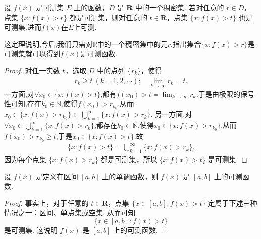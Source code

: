\documentclass[../../main.tex]{subfiles}
\begin{document}
\begin{theorem}\label{theorem:定理3.1}
设 \(f(x)\) 是可测集 \(E\) 上的函数，\(D\) 是 \(\mathbf{R}\) 中的一个稠密集. 若对任意的 \(r \in D\)，点集 \(\{x: f(x) > r\}\) 都是可测集，则对任意的 \(t \in \mathbf{R}\)，点集 \(\{x: f(x) > t\}\) 也是可测集.进而$f(x)$在$E$上可测.
\end{theorem}
\begin{note}
这定理说明,今后,我们只需对$\mathbb{R}$中的一个稠密集中的元$r$,指出集合$\{x:f(x)>r\}$是可测集就可以得到$f(x)$是可测函数.
\end{note}
\begin{proof}
对任一实数 \(t\)，选取 \(D\) 中的点列 \(\{r_k\}\)，使得
\begin{align*}
r_k \geqslant t\ (k = 1,2,\cdots); \quad \lim_{k \to \infty}r_k = t.
\end{align*}
一方面,对$\forall x_0\in \{x:f(x)>t\}$,都有$f(x_0)>t=\lim_{k\to \infty}r_k$.于是由极限的保号性可知,存在$k_0\in \mathbb{N}$,使得$f(x_0)>r_{k_0}$.从而$x_0\in \{x:f(x)>r_{k_0}\}\subset \bigcup_{k = 1}^{\infty}\{x: f(x) > r_k\}$.
另一方面,对$\forall x_0\in \bigcup_{k = 1}^{\infty}\{x: f(x) > r_k\}$,都存在$k_0\in \mathbb{N}$,使得$x_0\in \{x:f(x)>r_{k_0}\}$.从而$f(x_0)>r_{k_0}\geq t$,于是$x_0\in \{x:f(x)>t\}$.故
\begin{align}
\{x: f(x) > t\} = \bigcup_{k = 1}^{\infty}\{x: f(x) > r_k\}. \label{eq:3.1}
\end{align}
因为每个点集 \(\{x: f(x) > r_k\}\) 都是可测集，所以 \(\{x: f(x) > t\}\) 是可测集. 
\end{proof}

\begin{proposition}
设 \(f(x)\) 是定义在区间 \([a,b]\) 上的单调函数，则 \(f(x)\) 是 \([a,b]\) 上的可测函数.
\end{proposition}
\begin{proof}
事实上，对于任意的 \(t \in \mathbf{R}\)，点集 \(\{x \in [a,b]: f(x) > t\}\) 定属于下述三种情况之一：区间、单点集或空集. 从而可知
\[
\{x \in [a,b]: f(x) > t\}
\]
是可测集. 这说明 \(f(x)\) 是 \([a,b]\) 上的可测函数. 
\end{proof}
\end{document}
